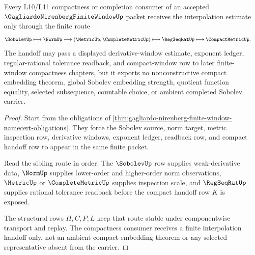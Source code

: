 \begin{theorem}
\label{thm:gagliardo-nirenberg-finite-window-interpolation-handoff}
Every L10/L11 compactness or completion consumer of an accepted $\GagliardoNirenbergFiniteWindowUp$ packet receives the interpolation estimate only through the finite route
$$
\SobolevUp\longmapsto\NormUp\longmapsto(\MetricUp,\CompleteMetricUp)\longmapsto\RegSeqRatUp\longmapsto\CompactMetricUp .
$$
The handoff may pass a displayed derivative-window estimate, exponent ledger, regular-rational tolerance readback, and compact-window row to later finite-window compactness chapters, but it exports no nonconstructive compact embedding theorem, global Sobolev embedding strength, quotient function equality, selected subsequence, countable choice, or ambient completed Sobolev carrier.
\end{theorem}
\begin{proof}
Start from the obligations of \autoref{thm:gagliardo-nirenberg-finite-window-namecert-obligations}. They force the Sobolev source, norm target, metric inspection row, derivative windows, exponent ledger, readback row, and compact handoff row to appear in the same finite packet.

Read the sibling route in order. The $\SobolevUp$ row supplies weak-derivative data, $\NormUp$ supplies lower-order and higher-order norm observations, $\MetricUp$ or $\CompleteMetricUp$ supplies inspection scale, and $\RegSeqRatUp$ supplies rational tolerance readback before the compact handoff row $K$ is exposed.

The structural rows $H,C,P,L$ keep that route stable under componentwise transport and replay. The compactness consumer receives a finite interpolation handoff only, not an ambient compact embedding theorem or any selected representative absent from the carrier.
\end{proof}


